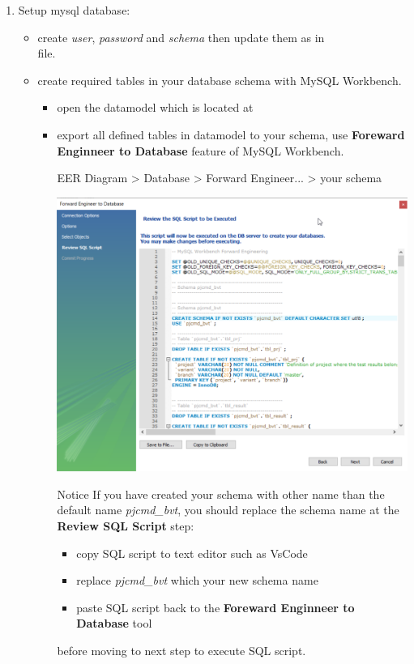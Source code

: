 \begin{enumerate}
\item Setup mysql database:
\begin{itemize}
\item create \emph{user}, \emph{password} and \emph{schema} then update them
      as  in  \\
       file.
\item create required tables in your database schema with MySQL Workbench.
\begin{itemize}
\item open the datamodel which is located at
\item export all defined tables in datamodel to your schema, use
      \textbf{Foreward Enginneer to Database} feature of MySQL Workbench.
\begin{robotlog}
EER Diagram > Database > Forward Engineer... > your schema
\end{robotlog}
\includegraphics[width=1\linewidth]{./pictures/forward_engineer.png}
\begin{boxhint}{Notice}
If you have created your schema with other name than the default
name \emph{pjcmd\_bvt}, you should replace the schema name at the \textbf{Review
SQL Script} step:
\begin{itemize}
\item copy SQL script to text editor such as VsCode
\item replace \emph{pjcmd\_bvt} which your new schema name
\item paste SQL script back to the \textbf{Foreward Enginneer to Database}
      tool
\end{itemize}
before moving to next step to execute SQL script.
\end{boxhint}


\end{itemize}
\end{itemize}
\end{enumerate}

